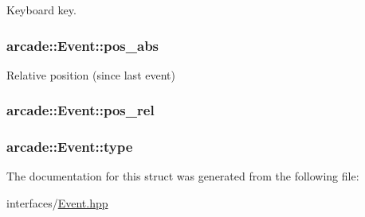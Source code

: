Keyboard key. 

\hypertarget{structarcade_1_1_event_a6fd21ebc551b688a77061cd44b01d425}{
\subsubsection[{pos\-\_\-abs}]{ arcade\-::\-Event\-::pos\-\_\-abs}}\label{structarcade_1_1_event_a6fd21ebc551b688a77061cd44b01d425}


Relative position (since last event) 

\hypertarget{structarcade_1_1_event_aa2b15c031d585e6ea86952bb579ca8ef}{
\subsubsection[{pos\-\_\-rel}]{ arcade\-::\-Event\-::pos\-\_\-rel}}\label{structarcade_1_1_event_aa2b15c031d585e6ea86952bb579ca8ef}
\hypertarget{structarcade_1_1_event_a6e626bbe20fac99017e390ea0239b9a6}{
\subsubsection[{type}]{ arcade\-::\-Event\-::type}}\label{structarcade_1_1_event_a6e626bbe20fac99017e390ea0239b9a6}


The documentation for this struct was generated from the following file\-:\begin{DoxyCompactItemize}
\item 
interfaces/\hyperlink{interfaces_2_event_8hpp}{Event.\-hpp}\end{DoxyCompactItemize}
